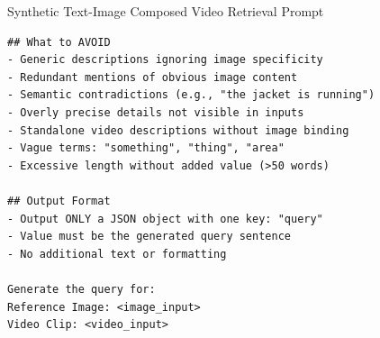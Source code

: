 \begin{promptbox}{Synthetic Text-Image Composed Video Retrieval Prompt}
\begin{lstlisting}[style=promptstyle]
## What to AVOID
- Generic descriptions ignoring image specificity
- Redundant mentions of obvious image content
- Semantic contradictions (e.g., "the jacket is running")
- Overly precise details not visible in inputs
- Standalone video descriptions without image binding
- Vague terms: "something", "thing", "area"
- Excessive length without added value (>50 words)

## Output Format
- Output ONLY a JSON object with one key: "query"
- Value must be the generated query sentence
- No additional text or formatting

Generate the query for:
Reference Image: <image_input>
Video Clip: <video_input>
\end{lstlisting}
\end{promptbox}

